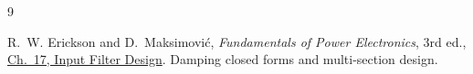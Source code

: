 \begin{thebibliography}{9}

	R.~W. Erickson and D.~Maksimovi\'c,
	\emph{Fundamentals of Power Electronics}, 3rd ed.,
	\href{https://doi.org/10.1007/978-3-030-43881-4_17}{Ch.~17, Input Filter Design}.
	Damping closed forms and multi-section design.

\end{thebibliography}
